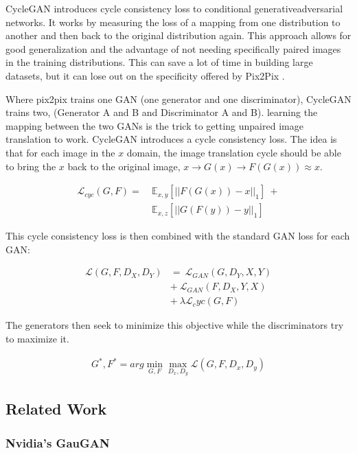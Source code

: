 \documentclass[twocolumn]{article}
\begin{document}
	CycleGAN introduces cycle consistency loss to conditional generativeadversarial networks. It works by measuring the loss of a mapping from one distribution to another and then back to the original distribution again. This approach allows for good generalization and the advantage of not needing specifically paired images in the training distributions. This can save a lot of time in building large datasets, but it can lose out on the specificity offered by Pix2Pix \cite{zhu2017unpaired}.
	
	Where pix2pix trains one GAN (one generator and one discriminator), CycleGAN trains two, (Generator A and B and Discriminator A and B). learning the mapping between the two GANs is the trick to getting unpaired image translation to work. CycleGAN introduces a cycle consistency loss. The idea is that for each image in the $x$ domain, the image translation cycle should be able to bring the $x$ back to the original image, $x \rightarrow G(x) \rightarrow F(G(x)) \approx x$.
	
	\begin{align*}
		\mathcal{L}_{cyc}(G, F) =\ & \mathbb{E}_{x,y}[||F(G(x)) - x||_1]\ + \\
		& \mathbb{E}_{x,z}[||G(F(y)) - y||_1]
	\end{align*}
	
	This cycle consistency loss is then combined with the standard GAN loss for each GAN:
	
	\begin{align*}
		\mathcal{L}(G, F, D_X, D_Y) &=\ \mathcal{L}_{GAN}(G, D_Y, X, Y) \\
		&+\ \mathcal{L}_{GAN}(F, D_X, Y, X) \\
		&+\ \lambda \mathcal{L}_cyc (G, F)  
	\end{align*}
	
	The generators then seek to minimize this objective while the discriminators try to maximize it.
	
	\begin{align*}
		G^*, F^* = arg \mathop{min}_{G,F} \mathop{max}_{D_x, D_y} \mathcal{L}(G, F, D_x, D_y)
	\end{align*}

	\subsection{Related Work}
	
	\subsubsection{Nvidia's GauGAN}
	
\end{document}
